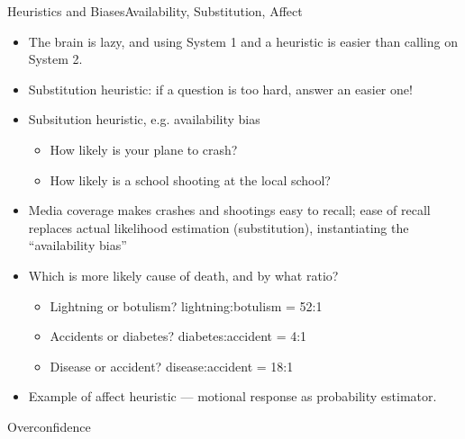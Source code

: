 \documentclass{beamer}
\begin{document}
\begin{frame}{Heuristics and Biases}{Availability, Substitution, Affect}
\begin{itemize}
\item The brain is lazy, and using System 1 and a heuristic is easier than calling on System 2.
\item Substitution heuristic: if a question is too hard, answer an easier one!
\item Subsitution heuristic, e.g. availability bias
    \begin{itemize}
    \item How likely is your plane to crash?
    \item How likely is a school shooting at the local school?
    \end{itemize}
\item Media coverage makes crashes and shootings easy to recall; ease of recall replaces actual likelihood estimation (substitution), instantiating the ``availability bias'' 
\item Which is more likely cause of death, and by what ratio? 
    \begin{itemize}
    \item Lightning or botulism? lightning:botulism = 52:1
    \item Accidents or diabetes? diabetes:accident = 4:1
    \item Disease or accident? disease:accident = 18:1
    \end{itemize}
\item Example of affect heuristic --- motional response as probability estimator.
\end{itemize}

\end{frame}

\begin{frame}{Overconfidence}{}

\end{frame}




\end{document}
